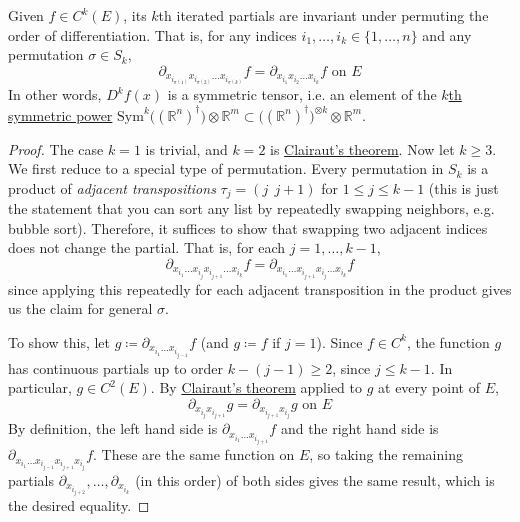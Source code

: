   \begin{corollary}
    \label{thm:symmetry-in-kth-iterated-partials}
    Given $f \in C^k(E)$, its $k$th iterated partials are invariant under permuting the order of differentiation. That is, for any indices $i_1, \ldots, i_k \in \{1, \ldots, n\}$ and any permutation $\sigma \in S_k$,
    \begin{equation}
      \partial_{x_{i_{\sigma(1)}} x_{i_{\sigma(2)}} \ldots x_{i_{\sigma(k)}}} f = \partial_{x_{i_1} x_{i_2} \ldots x_{i_k}} f \text{ on } E
    \end{equation}
    In other words, $D^k f(x)$ is a symmetric tensor, i.e. an element of the \hyperref[lin-def:symmetric-power]{$k$th symmetric power} $\mathrm{Sym}^k \big( (\mathbb{R}^n)^\dagger \big) \otimes \mathbb{R}^m \subset \big( (\mathbb{R}^n)^\dagger \big)^{\otimes k} \otimes \mathbb{R}^m$.
  \end{corollary}
  \begin{proof}
    The case $k = 1$ is trivial, and $k = 2$ is \hyperref[thm:clairuts-theorem]{Clairaut's theorem}. Now let $k \geq 3$. We first reduce to a special type of permutation. Every permutation in $S_k$ is a product of \textit{adjacent transpositions} $\tau_j = (j \;\, j+1)$ for $1 \leq j \leq k - 1$ (this is just the statement that you can sort any list by repeatedly swapping neighbors, e.g. bubble sort). Therefore, it suffices to show that swapping two adjacent indices does not change the partial. That is, for each $j = 1, \ldots, k-1$,
    \begin{equation}
      \partial_{x_{i_1} \ldots x_{i_{j}} x_{i_{j+1}} \ldots x_{i_k}} f = \partial_{x_{i_1} \ldots x_{i_{j+1}} x_{i_{j}} \ldots x_{i_k}} f
    \end{equation}
    since applying this repeatedly for each adjacent transposition in the product gives us the claim for general $\sigma$.

    To show this, let $g \coloneqq \partial_{x_{i_1} \ldots x_{i_{j-1}}} f$ (and $g \coloneqq f$ if $j = 1$). Since $f \in C^k$, the function $g$ has continuous partials up to order $k - (j-1) \geq 2$, since $j \leq k-1$. In particular, $g \in C^2(E)$. By \hyperref[thm:clairuts-theorem]{Clairaut's theorem} applied to $g$ at every point of $E$,
    \begin{equation}
      \partial_{x_{i_j} x_{i_{j+1}}} g = \partial_{x_{i_{j+1}} x_{i_j}} g \text{ on } E
    \end{equation}
    By definition, the left hand side is $\partial_{x_{i_1} \ldots x_{i_{j+1}}} f$ and the right hand side is $\partial_{x_{i_1} \ldots x_{i_{j-1}} x_{i_{j+1}} x_{i_j}} f$. These are the same function on $E$, so taking the remaining partials $\partial_{x_{i_{j+2}}}, \ldots, \partial_{x_{i_k}}$ (in this order) of both sides gives the same result, which is the desired equality.
  \end{proof}

